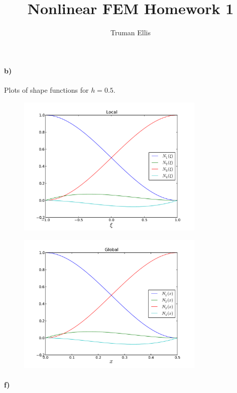 \documentclass[12pt]{article}
\title{Nonlinear FEM Homework 1}
\author{Truman Ellis}
\date{}
\begin{document}
\paragraph{b)}
Plots of shape functions for $h=0.5$.
\begin{figure}[h!]
\centering
\includegraphics[width=0.8\textwidth]{Local.pdf}
\end{figure}
\begin{figure}[h!]
\centering
\includegraphics[width=0.8\textwidth]{Global.pdf}
\end{figure}

\paragraph{f)}
\end{document}

